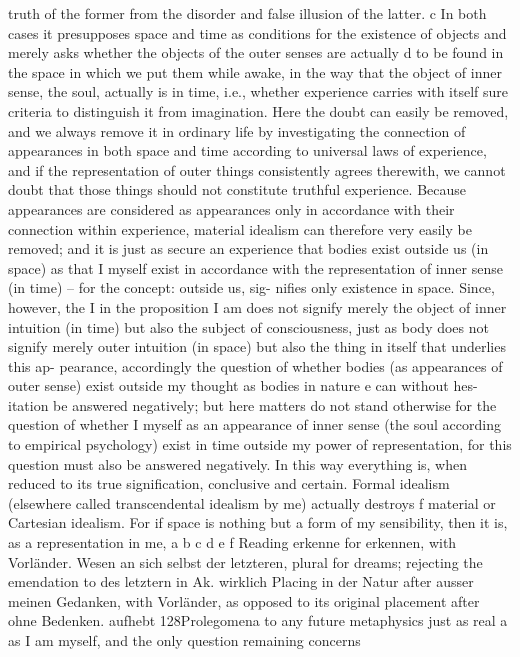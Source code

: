 truth of the former from the disorder and false illusion of the latter. c In
both cases it presupposes space and time as conditions for the existence
of objects and merely asks whether the objects of the outer senses are
actually d to be found in the space in which we put them while awake,
in the way that the object of inner sense, the soul, actually is in time,
i.e., whether experience carries with itself sure criteria to distinguish it
from imagination. Here the doubt can easily be removed, and we always
remove it in ordinary life by investigating the connection of appearances
in both space and time according to universal laws of experience, and
if the representation of outer things consistently agrees therewith, we
cannot doubt that those things should not constitute truthful experience.
Because appearances are considered as appearances only in accordance
with their connection within experience, material idealism can therefore
very easily be removed; and it is just as secure an experience that bodies
exist outside us (in space) as that I myself exist in accordance with the
representation of inner sense (in time) – for the concept: outside us, sig-
niﬁes only existence in space. Since, however, the I in the proposition
I am does not signify merely the object of inner intuition (in time) but
also the subject of consciousness, just as body does not signify merely
outer intuition (in space) but also the thing in itself that underlies this ap-
pearance, accordingly the question of whether bodies (as appearances of
outer sense) exist outside my thought as bodies in nature e can without hes-
itation be answered negatively; but here matters do not stand otherwise
for the question of whether I myself as an appearance of inner sense (the
soul according to empirical psychology) exist in time outside my power
of representation, for this question must also be answered negatively. In
this way everything is, when reduced to its true signiﬁcation, conclusive
and certain. Formal idealism (elsewhere called transcendental idealism
by me) actually destroys f material or Cartesian idealism. For if space is
nothing but a form of my sensibility, then it is, as a representation in me,
a
b
c
d
e
f
Reading erkenne for erkennen, with Vorländer.
Wesen an sich selbst
der letzteren, plural for dreams; rejecting the emendation to des letztern in Ak.
wirklich
Placing in der Natur after ausser meinen Gedanken, with Vorländer, as opposed to its
original placement after ohne Bedenken.
aufhebt
128Prolegomena to any future metaphysics
just as real a as I am myself, and the only question remaining concerns

